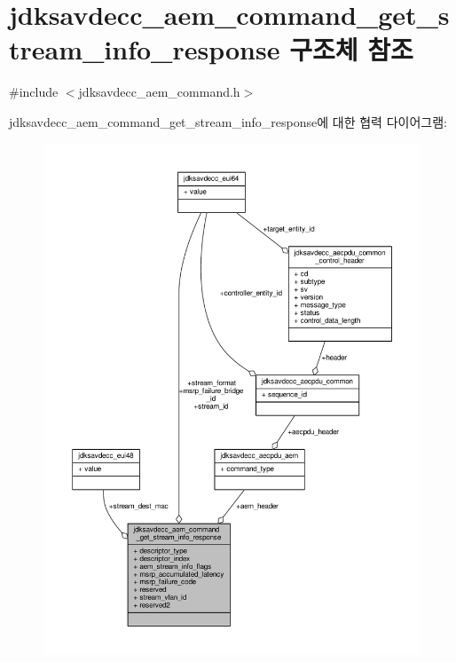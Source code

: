 \hypertarget{structjdksavdecc__aem__command__get__stream__info__response}{}\section{jdksavdecc\+\_\+aem\+\_\+command\+\_\+get\+\_\+stream\+\_\+info\+\_\+response 구조체 참조}
\label{structjdksavdecc__aem__command__get__stream__info__response}


{\ttfamily \#include $<$jdksavdecc\+\_\+aem\+\_\+command.\+h$>$}



jdksavdecc\+\_\+aem\+\_\+command\+\_\+get\+\_\+stream\+\_\+info\+\_\+response에 대한 협력 다이어그램\+:
\nopagebreak
\begin{figure}[H]
\begin{center}
\leavevmode
\includegraphics[width=350pt]{structjdksavdecc__aem__command__get__stream__info__response__coll__graph}
\end{center}
\end{figure}
